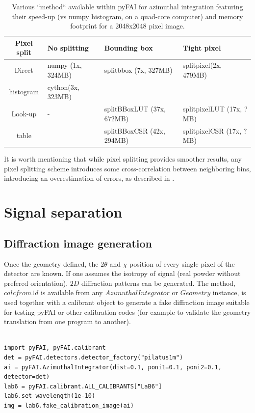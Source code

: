 \documentclass[preprint]{iucr}
\begin{document}
\begin{table}[ht]
\caption{Various ``method`` available within pyFAI for azimuthal integration
featuring their speed-up (vs numpy histogram, on a quad-core computer) and
memory footprint for a 2048x2048 pixel image.}
\begin{tabular}[pos]{|c|l|l|l|}
\hline
Pixel split& No splitting & Bounding box & Tight pixel \\
\hline
Direct    & numpy (1x, 324MB) & splitbbox (7x, 327MB) & splitpixel(2x, 479MB)\\
histogram & cython(3x, 323MB) &                       &                \\
\hline
Look-up   & -      & splitBBoxLUT (37x, 672MB)&splitpixelLUT (17x, ?MB)\\
table     &        & splitBBoxCSR (42x, 294MB)&splitpixelCSR (17x, ?MB)\\
\hline
\end{tabular}
\label{table:methods}
\end{table}

It is worth mentioning that while pixel splitting provides smoother results, any
pixel splitting scheme introduces some cross-correlation between neighboring
bins, introducing an overestimation of errors, as described in \cite{billinge2014}.

\section{Signal separation}



\subsection{Diffraction image generation}

Once the geometry defined, the $2\theta$ and $\chi$ position of every single
pixel of the detector are known.
If one assumes the isotropy of signal (real powder without prefered
orientation), $2D$ diffraction patterns can be generated.
The method, $calcfrom1d$ is available from any $Azimuthal Integrator$ or
$Geometry$ instance, is used together with a calibrant object
to generate a fake diffraction image suitable for testing pyFAI or other 
calibration codes (for example to validate the geometry translation from one
program to another).

\begin{verbatim}

import pyFAI, pyFAI.calibrant
det = pyFAI.detectors.detector_factory("pilatus1m")
ai = pyFAI.AzimuthalIntegrator(dist=0.1, poni1=0.1, poni2=0.1, detector=det)
lab6 = pyFAI.calibrant.ALL_CALIBRANTS["LaB6"]
lab6.set_wavelength(1e-10)
img = lab6.fake_calibration_image(ai)
\end{verbatim}
\end{document}
